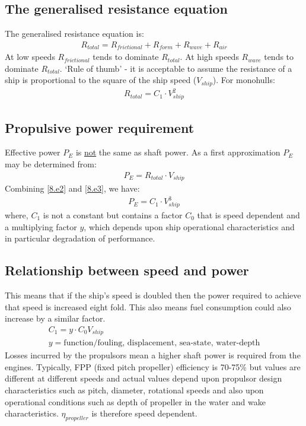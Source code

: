 \subsection{The generalised resistance equation}
The generalised resistance equation is:
\begin{gather}
    R_{total} = R_{frictional} + R_{form} + R_{wave} + R_{air}
\end{gather}
At low speeds $R_{frictional}$ tends to dominate $R_{total}$. At high speeds $R_{wave}$ tends to dominate $R_{total}$. `Rule of thumb' - it is acceptable to assume the resistance of a ship is proportional to the square of the ship speed ($V_{ship}$). For monohulls:
\begin{gather}\label{8.e2}
    R_{total} = C_1 \cdot V_{ship}^2
\end{gather}
\subsection{Propulsive power requirement}
Effective power $P_E$ is \underline{not} the same as shaft power. As a first approximation $P_E$ may be determined from:
\begin{gather}\label{8.e3}
    P_E = R_{total} \cdot V_{ship}
\end{gather}
Combining \eqref{8.e2} and \eqref{8.e3}, we have:
\begin{gather}
    P_E = C_1 \cdot V_{ship}^3
\end{gather}
where, $C_1$ is not a constant but contains a factor $C_0$ that is speed dependent and a multiplying factor $y$, which depends upon ship operational characteristics and in particular degradation of performance.
\subsection{Relationship between speed and power}
This means that if the ship's speed is doubled then the power required to achieve that speed is increased eight fold. This also means fuel consumption could also increase by a similar factor.
\begin{gather}\label{8.e5}
    C_1 = y \cdot C_0 V_{ship}\\
    y = \textrm{function/fouling, displacement, sea-state, water-depth}
\end{gather}
Losses incurred by the propulsors mean a higher shaft power is required from the engines. Typically, FPP (fixed pitch propeller) efficiency is 70-75\% but values are different at different speeds and actual values depend upon propulsor design characteristics such as pitch, diameter, rotational speeds and also upon operational conditions such as depth of propeller in the water and wake characteristics. $\eta_{propeller}$ is therefore speed dependent.
